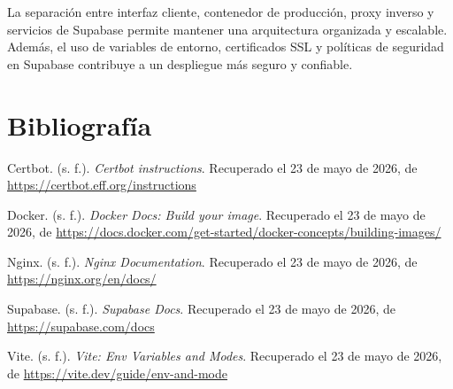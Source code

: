 \documentclass[12pt,letterpaper]{article}
\begin{document}
La separación entre interfaz cliente, contenedor de producción, proxy inverso y servicios de Supabase permite mantener una arquitectura organizada y escalable. Además, el uso de variables de entorno, certificados SSL y políticas de seguridad en Supabase contribuye a un despliegue más seguro y confiable.

\newpage
\section*{Bibliografía}

Certbot. (s. f.). \textit{Certbot instructions}. Recuperado el 23 de mayo de 2026, de \url{https://certbot.eff.org/instructions}

Docker. (s. f.). \textit{Docker Docs: Build your image}. Recuperado el 23 de mayo de 2026, de \url{https://docs.docker.com/get-started/docker-concepts/building-images/}

Nginx. (s. f.). \textit{Nginx Documentation}. Recuperado el 23 de mayo de 2026, de \url{https://nginx.org/en/docs/}

Supabase. (s. f.). \textit{Supabase Docs}. Recuperado el 23 de mayo de 2026, de \url{https://supabase.com/docs}

Vite. (s. f.). \textit{Vite: Env Variables and Modes}. Recuperado el 23 de mayo de 2026, de \url{https://vite.dev/guide/env-and-mode}
\end{document}
